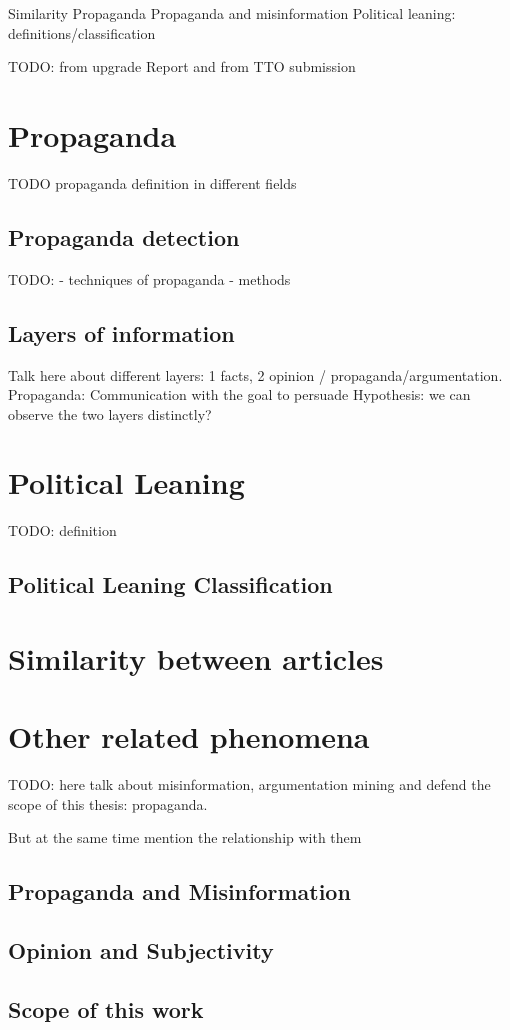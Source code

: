 Similarity
Propaganda
Propaganda and misinformation
Political leaning: definitions/classification


TODO: from upgrade Report and from TTO submission

\section{Propaganda}
\label{sec:lit_propaganda}

TODO propaganda definition in different fields

\subsection{Propaganda detection}
\label{ssec:lit_propaganda_detection}

TODO: 
- techniques of propaganda
- methods

\subsection{Layers of information}
\label{ssec:lit_layers_of_info}

Talk here about different layers: 1 facts, 2 opinion / propaganda/argumentation.
Propaganda: Communication with the goal to persuade
Hypothesis: we can observe the two layers distinctly?

\section{Political Leaning}
\label{sec:lit_leaning}

TODO: definition

\subsection{Political Leaning Classification}
\label{ssec:lit_leaning_classification}

\section{Similarity between articles}
\label{sec:lit_relationships}

\section{Other related phenomena}

TODO: here talk about misinformation, argumentation mining and defend the scope of this thesis: propaganda.

But at the same time mention the relationship with them

\subsection{Propaganda and Misinformation}

\subsection{Opinion and Subjectivity}

\subsection{Scope of this work}
